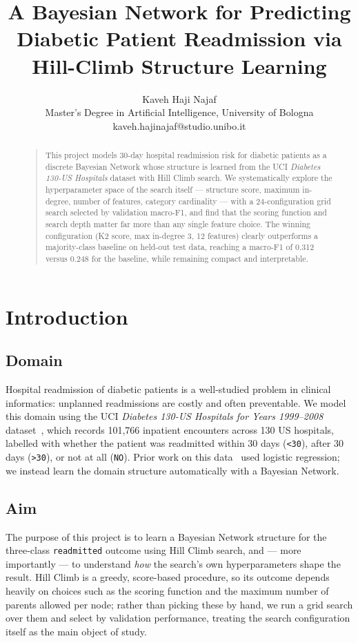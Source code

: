\documentclass[letterpaper]{article}
\begin{document}
\title{A Bayesian Network for Predicting Diabetic Patient Readmission via Hill-Climb Structure Learning}
\author{Kaveh Haji Najaf\\
Master's Degree in Artificial Intelligence, University of Bologna\\
kaveh.hajinajaf@studio.unibo.it
}
\maketitle

\begin{abstract}
\begin{quote}
This project models 30-day hospital readmission risk for diabetic patients as a discrete Bayesian Network whose structure is learned from the UCI \emph{Diabetes 130-US Hospitals} dataset with Hill Climb search. We systematically explore the hyperparameter space of the search itself — structure score, maximum in-degree, number of features, category cardinality — with a 24-configuration grid search selected by validation macro-F1, and find that the scoring function and search depth matter far more than any single feature choice. The winning configuration (K2 score, max in-degree 3, 12 features) clearly outperforms a majority-class baseline on held-out test data, reaching a macro-F1 of 0.312 versus 0.248 for the baseline, while remaining compact and interpretable.
\end{quote}
\end{abstract}


\section{Introduction}
\subsection{Domain}
Hospital readmission of diabetic patients is a well-studied problem in clinical informatics: unplanned readmissions are costly and often preventable. We model this domain using the UCI \emph{Diabetes 130-US Hospitals for Years 1999--2008} dataset~\cite{diabetes130}, which records 101{,}766 inpatient encounters across 130 US hospitals, labelled with whether the patient was readmitted within 30 days (\texttt{<30}), after 30 days (\texttt{>30}), or not at all (\texttt{NO}). Prior work on this data~\cite{strack2014impact} used logistic regression; we instead learn the domain structure automatically with a Bayesian Network.

\subsection{Aim}
The purpose of this project is to learn a Bayesian Network structure for the three-class \texttt{readmitted} outcome using Hill Climb search, and — more importantly — to understand \emph{how} the search's own hyperparameters shape the result. Hill Climb is a greedy, score-based procedure, so its outcome depends heavily on choices such as the scoring function and the maximum number of parents allowed per node; rather than picking these by hand, we run a grid search over them and select by validation performance, treating the search configuration itself as the main object of study.
\end{document}
